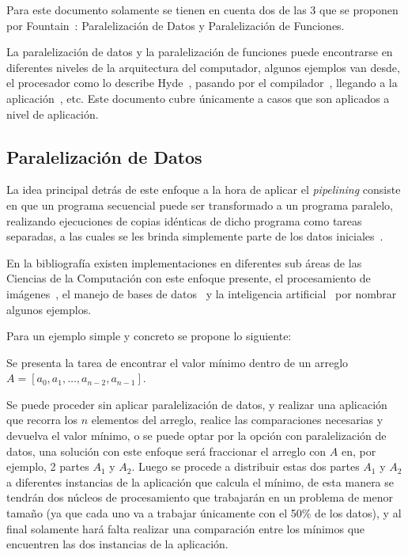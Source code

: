Para este documento solamente se tienen en cuenta dos de las 3 que se 
proponen por Fountain~\cite{fountain1994}: Paralelización de Datos y
Paralelización de Funciones.

La paralelización de datos y la paralelización de funciones puede encontrarse 
en diferentes niveles de la arquitectura
del computador, algunos ejemplos van desde, el procesador como lo describe
Hyde~\cite{fountain1994}, pasando por el compilador~\cite{clark1997}, llegando
a la aplicación~\cite{wolters1995}, etc. Este 
documento cubre únicamente a casos que son aplicados a nivel de aplicación.

\subsection{Paralelización de Datos}
\label{ssec:paralelizacion_de_datos}

\begin{tcolorbox}
La idea principal detrás de este enfoque a la hora de aplicar el {\it pipelining}
consiste en que un programa secuencial puede ser transformado a un
programa paralelo, realizando ejecuciones de copias idénticas de dicho programa como
tareas separadas, a las cuales se les brinda simplemente parte de los datos
iniciales~\cite{haveraaen2000}.
\end{tcolorbox}




En la bibliografía existen implementaciones en diferentes sub áreas de las Ciencias de la
Computación con este enfoque presente, el procesamiento de
imágenes~\cite{pang2009}, el manejo de bases de
datos~\cite{zakharov2019} y la inteligencia artificial~\cite{hajj2015} por
nombrar algunos ejemplos. 

Para un ejemplo simple y concreto se propone lo siguiente: 

\begin{tcolorbox} \label{ej:1} 
  Se presenta la tarea de encontrar el valor mínimo dentro de un arreglo 
  $A = [a_{0}, a_{1}, \ldots , a_{n-2}, a_{n-1}]$.
\end{tcolorbox}

Se puede proceder sin aplicar paralelización de datos, y realizar una
aplicación que recorra los $n$ elementos del arreglo, realice las
comparaciones necesarias y devuelva el valor mínimo, o se puede
optar por la opción con paralelización de datos, una solución con este enfoque 
será fraccionar el arreglo con $A$ en, por ejemplo, 2 partes $A_{1}$ y
$A_{2}$. Luego se procede a distribuir estas dos partes $A_{1}$ y
$A_{2}$ a diferentes instancias de la aplicación que calcula el mínimo, 
de esta manera se tendrán dos núcleos de procesamiento que trabajarán en un
problema de menor tamaño (ya que
cada uno va a trabajar únicamente con el 50\% de los datos), y al final
solamente hará falta realizar una comparación entre los mínimos que
encuentren las dos instancias de la aplicación.


